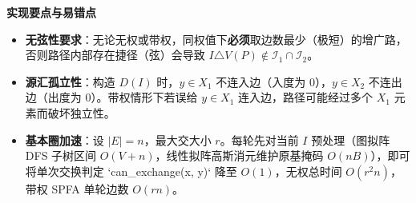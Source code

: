 \textbf{实现要点与易错点}
\begin{itemize}
    \item \textbf{无弦性要求}：无论无权或带权，同权值下\textbf{必须}取边数最少（极短）的增广路，否则路径内部存在捷径（弦）会导致 $I\triangle V(P)\notin\mathcal{I}_1\cap\mathcal{I}_2$。
    \item \textbf{源汇孤立性}：构造 $D(I)$ 时，$y\in X_1$ 不连入边（入度为 $0$），$y\in X_2$ 不连出边（出度为 $0$）。带权情形下若误给 $y\in X_1$ 连入边，路径可能经过多个 $X_1$ 元素而破坏独立性。
    \item \textbf{基本圈加速}：设 $|E|=n$，最大交大小 $r$。每轮先对当前 $I$ 预处理（图拟阵 DFS 子树区间 $O(V+n)$，线性拟阵高斯消元维护原基掩码 $O(nB)$），即可将单次交换判定 `can\_exchange(x, y)` 降至 $O(1)$，无权总时间 $O(r^2 n)$，带权 SPFA 单轮边数 $O(rn)$。
\end{itemize}
